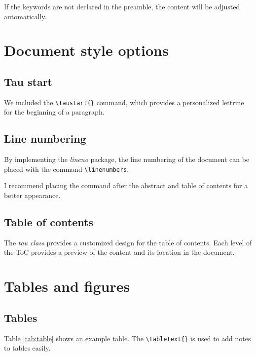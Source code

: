 \documentclass[9pt,a4paper,twocolumn,twoside]{tau-class/tau}
\begin{document}
    If the keywords are not declared in the preamble, the content will be adjusted automatically.
    
\section{Document style options}

    \subsection{Tau start}
	
        We included the \verb|\taustart{}| command, which provides a personalized lettrine for the beginning of a paragraph.

    \subsection{Line numbering}
	
        By implementing the \textit{lineno} package, the line numbering of the document can be placed with the command \verb|\linenumbers|. 
		
        I recommend placing the command after the abstract and table of contents for a better appearance.
		
    \subsection{Table of contents}
	
        The \textit{tau class} provides a customized design for the table of contents. Each level of the ToC provides a preview of the content and its location in the document. 
		
\section{Tables and figures}

    \subsection{Tables}
	
        Table \ref{tab:table} shows an example table. The \verb|\tabletext{}| is used to add notes to tables easily. 
    		
\end{document}
